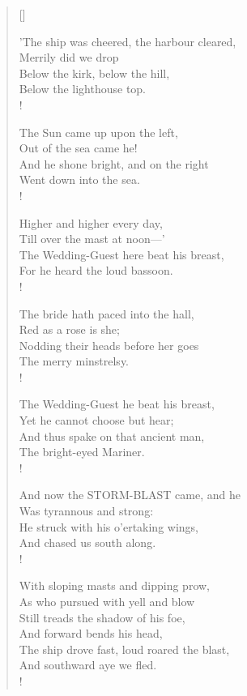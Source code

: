 \documentclass[11pt]{article}
\begin{document}
\begin{verse}[\linewidth]
\bigskip

'The ship was cheered, the harbour cleared, \\
Merrily did we drop \\
Below the kirk, below the hill, \\
Below the lighthouse top. \\!

The Sun came up upon the left, \\
Out of the sea came he! \\
And he shone bright, and on the right \\
Went down into the sea. \\!

\clearpage

Higher and higher every day, \\
Till over the mast at noon—' \\
The Wedding-Guest here beat his breast, \\
For he heard the loud bassoon. \\!

The bride hath paced into the hall, \\
Red as a rose is she; \\
Nodding their heads before her goes \\
The merry minstrelsy. \\!

The Wedding-Guest he beat his breast, \\
Yet he cannot choose but hear; \\
And thus spake on that ancient man, \\
The bright-eyed Mariner. \\!

\bigskip

And now the STORM-BLAST came, and he \\
Was tyrannous and strong: \\
He struck with his o'ertaking wings, \\
And chased us south along. \\!

With sloping masts and dipping prow, \\
As who pursued with yell and blow \\
Still treads the shadow of his foe, \\
And forward bends his head, \\
The ship drove fast, loud roared the blast, \\
And southward aye we fled. \\!


\end{verse}
\end{document}
